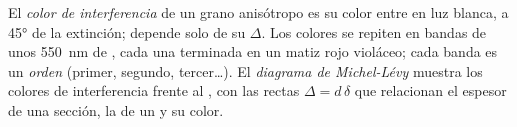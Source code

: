 \begin{definition}\label{def:b1:optical-mineralogy:interference-colour}
El \emph{color de interferencia} de un grano anisótropo es su color entre  en luz blanca, a \ang{45} de la extinción; depende solo de su  $\Delta$. Los colores se repiten en
bandas de unos \qty{550}{nm} de , cada una terminada en un matiz rojo violáceo; cada banda es un
\emph{orden} (primer, segundo, tercer\dots). El \emph{diagrama de
Michel-Lévy} muestra los colores de interferencia frente al , con las rectas
$\Delta = d\,\delta$ que relacionan el espesor de una sección, la  de un  y su color.
\end{definition}

